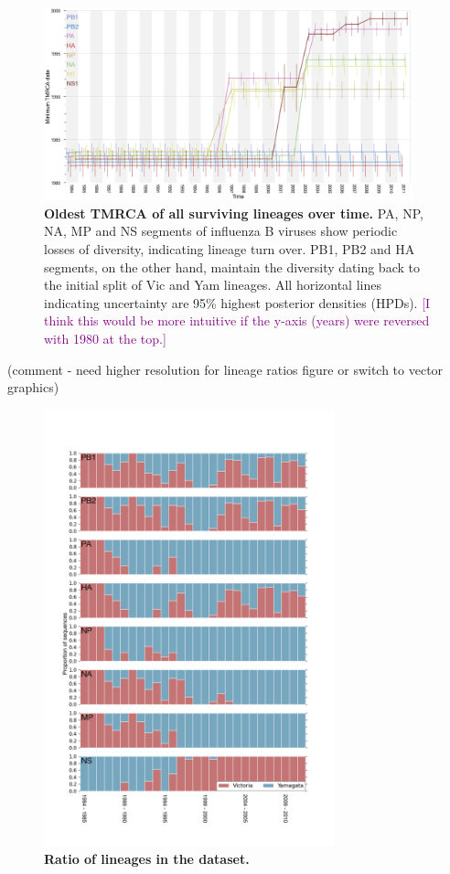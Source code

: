 \documentclass[11pt,oneside,letterpaper]{article}
\def\tbc#1{\textcolor{purple}{[#1]}}
\begin{document}
\begin{figure}[h]
	\centering		
	\includegraphics[width=0.95\textwidth]{figures/InfB_tmrcaOT_lines.png}
	\caption{\textbf{Oldest TMRCA of all surviving lineages over time.}
PA, NP, NA, MP and NS segments of influenza B viruses show periodic losses of diversity, indicating lineage turn over.
PB1, PB2 and HA segments, on the other hand, maintain the diversity dating back to the initial split of Vic and Yam lineages.
All horizontal lines indicating uncertainty are 95\% highest posterior densities (HPDs). \tbc{I think this would be more intuitive if the y-axis (years) were reversed with 1980 at the top.}}
	\label{tmrcaOT}
\end{figure}

(comment - need higher resolution for lineage ratios figure or switch to vector graphics)
\begin{figure}[h]
	\centering	
	\includegraphics[width=0.75\textwidth]	{figures/InfB_LineageRatiosOverTime.png}
	\caption{\textbf{Ratio of lineages in the dataset.}}
	\label{lineageRatiosOverTime}
\end{figure}
\end{document}
